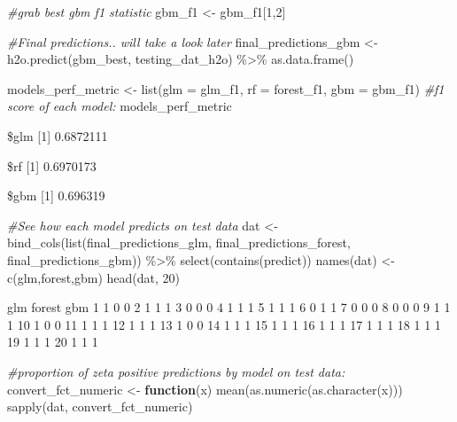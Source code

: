 \documentclass[
]{article}
\newenvironment{Shaded}{\begin{snugshade}}{\end{snugshade}}
\newcommand{\AttributeTok}[1]{\textcolor[rgb]{0.77,0.63,0.00}{#1}}
\newcommand{\CommentTok}[1]{\textcolor[rgb]{0.56,0.35,0.01}{\textit{#1}}}
\newcommand{\ControlFlowTok}[1]{\textcolor[rgb]{0.13,0.29,0.53}{\textbf{#1}}}
\newcommand{\DecValTok}[1]{\textcolor[rgb]{0.00,0.00,0.81}{#1}}
\newcommand{\FunctionTok}[1]{\textcolor[rgb]{0.00,0.00,0.00}{#1}}
\newcommand{\NormalTok}[1]{#1}
\newcommand{\OtherTok}[1]{\textcolor[rgb]{0.56,0.35,0.01}{#1}}
\newcommand{\SpecialCharTok}[1]{\textcolor[rgb]{0.00,0.00,0.00}{#1}}
\newcommand{\StringTok}[1]{\textcolor[rgb]{0.31,0.60,0.02}{#1}}
\begin{document}
\begin{Shaded}
\begin{Highlighting}[]
\CommentTok{\#grab best gbm f1 statistic}
\NormalTok{gbm\_f1 }\OtherTok{\textless{}{-}}\NormalTok{ gbm\_f1[}\DecValTok{1}\NormalTok{,}\DecValTok{2}\NormalTok{]}

\CommentTok{\#Final predictions.. will take a look later}
\NormalTok{final\_predictions\_gbm }\OtherTok{\textless{}{-}} \FunctionTok{h2o.predict}\NormalTok{(gbm\_best, testing\_dat\_h2o) }\SpecialCharTok{\%\textgreater{}\%}
  \FunctionTok{as.data.frame}\NormalTok{()}

\NormalTok{models\_perf\_metric }\OtherTok{\textless{}{-}} \FunctionTok{list}\NormalTok{(}\AttributeTok{glm =}\NormalTok{ glm\_f1, }\AttributeTok{rf =}\NormalTok{ forest\_f1, }\AttributeTok{gbm =}\NormalTok{ gbm\_f1)}
\CommentTok{\#f1 score of each model:}
\NormalTok{models\_perf\_metric}
\end{Highlighting}
\end{Shaded}

\$glm {[}1{]} 0.6872111

\$rf {[}1{]} 0.6970173

\$gbm {[}1{]} 0.696319

\begin{Shaded}
\begin{Highlighting}[]
\CommentTok{\#See how each model predicts on test data}
\NormalTok{dat }\OtherTok{\textless{}{-}} \FunctionTok{bind\_cols}\NormalTok{(}\FunctionTok{list}\NormalTok{(final\_predictions\_glm, final\_predictions\_forest, final\_predictions\_gbm)) }\SpecialCharTok{\%\textgreater{}\%}
  \FunctionTok{select}\NormalTok{(}\FunctionTok{contains}\NormalTok{(}\StringTok{\textquotesingle{}predict\textquotesingle{}}\NormalTok{))}
\FunctionTok{names}\NormalTok{(dat) }\OtherTok{\textless{}{-}} \FunctionTok{c}\NormalTok{(}\StringTok{\textquotesingle{}glm\textquotesingle{}}\NormalTok{,}\StringTok{\textquotesingle{}forest\textquotesingle{}}\NormalTok{,}\StringTok{\textquotesingle{}gbm\textquotesingle{}}\NormalTok{)}
\FunctionTok{head}\NormalTok{(dat, }\DecValTok{20}\NormalTok{)}
\end{Highlighting}
\end{Shaded}

glm forest gbm 1 1 0 0 2 1 1 1 3 0 0 0 4 1 1 1 5 1 1 1 6 0 1 1 7 0 0 0 8
0 0 0 9 1 1 1 10 1 0 0 11 1 1 1 12 1 1 1 13 1 0 0 14 1 1 1 15 1 1 1 16 1
1 1 17 1 1 1 18 1 1 1 19 1 1 1 20 1 1 1

\begin{Shaded}
\begin{Highlighting}[]
\CommentTok{\#proportion of zeta positive predictions by model on test data:}
\NormalTok{convert\_fct\_numeric }\OtherTok{\textless{}{-}} \ControlFlowTok{function}\NormalTok{(x) }\FunctionTok{mean}\NormalTok{(}\FunctionTok{as.numeric}\NormalTok{(}\FunctionTok{as.character}\NormalTok{(x)))}
\FunctionTok{sapply}\NormalTok{(dat, convert\_fct\_numeric)}
\end{Highlighting}
\end{Shaded}
\end{document}
